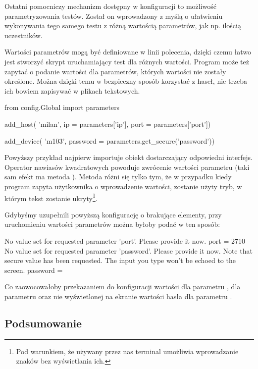 \documentclass[00-praca-magisterska.tex]{subfiles}
\begin{document}
Ostatni pomocniczy mechanizm dostępny w konfiguracji to możliwość
parametryzowania testów. Został on wprowadzony z myślą o ułatwieniu wykonywania
tego samego testu z różną wartością parametrów, jak np. ilością uczestników.

Wartości parametrów mogą być definiowane w linii polecenia, dzięki czemu łatwo
jest stworzyć skrypt uruchamiający test dla różnych wartości. Program może też
zapytać o podanie wartości dla parametrów, których wartości nie zostały
określone. Można dzięki temu w bezpieczny sposób korzystać z haseł, nie trzeba
ich bowiem zapisywać w plikach tekstowych.

\begin{pythoncode}
  from config.Global import parameters

  add_host(
      'milan',
      ip = parameters['ip'],
      port = parameters['port'])

  add_device(
      'm103',
      password = parameters.get_secure('password'))
\end{pythoncode}

Powyższy przykład najpierw importuje obiekt  dostarczający
odpowiedni interfejs. Operator nawiasów kwadratowych powoduje zwrócenie
wartości parametru  (taki sam efekt ma metoda ). Metoda
 różni się tylko tym, że w przypadku kiedy program zapyta
użytkownika o wprowadzenie wartości, zostanie użyty tryb, w którym tekst
zostanie ukryty\footnote{Pod warunkiem, że używany przez nas terminal umożliwia
wprowadzanie znaków bez wyświetlania ich.}.

Gdybyśmy uzupełnili powyższą konfigurację o brakujące elementy, przy
uruchomieniu wartości parametrów można byłoby podać w ten sposób:

\begin{textcode}
  No value set for requested parameter 'port'. Please provide it now.
  port = 2710
  No value set for requested parameter 'password'. Please provide it now.
  Note that secure value has been requested. The input you type won't be echoed
  to the screen.
  password = 
\end{textcode}

Co zaowocowałoby przekazaniem do konfiguracji wartości  dla
parametru ,  dla parametru  oraz nie
wyświetlonej na ekranie wartości hasła dla parametru .

\subsection{Podsumowanie}
\end{document}
